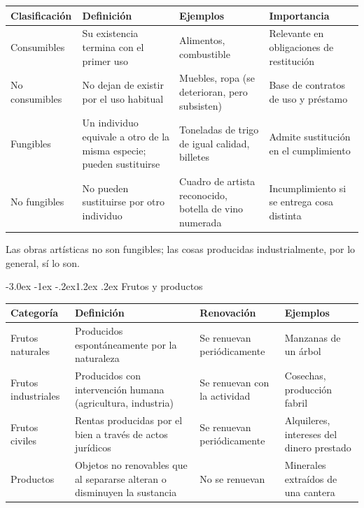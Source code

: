 \documentclass[12pt,oneside]{book}
\makeatletter
\renewcommand\section{\@startsection{section}{1}{\z@}%
  {-3.0ex \@plus -1ex \@minus -.2ex}{1.2ex \@plus .2ex}%
  {\normalfont\large\bfseries\color{acento}}}
\newenvironment{tabla}{%
    \par\medskip\begingroup\small\renewcommand{\arraystretch}{1.3}\noindent\ignorespaces
}{%
    \par\endgroup\medskip
}
\makeatother
\begin{document}
\begin{tabla}
\begin{tabularx}{\textwidth}{B{3.0cm}YYY}
\toprule
Clasificación & \textbf{Definición} & \textbf{Ejemplos} & \textbf{Importancia} \\
\midrule
Consumibles & Su existencia termina con el primer uso & Alimentos, combustible & Relevante en obligaciones de restitución \\
No consumibles & No dejan de existir por el uso habitual & Muebles, ropa (se deterioran, pero subsisten) & Base de contratos de uso y préstamo \\
Fungibles & Un individuo equivale a otro de la misma especie; pueden sustituirse & Toneladas de trigo de igual calidad, billetes & Admite sustitución en el cumplimiento \\
No fungibles & No pueden sustituirse por otro individuo & Cuadro de artista reconocido, botella de vino numerada & Incumplimiento si se entrega cosa distinta \\
\bottomrule
\end{tabularx}
\end{tabla}

Las obras artísticas no son fungibles; las cosas producidas industrialmente, por lo general, sí lo son.

\section{Frutos y productos}

\begin{tabla}
\begin{tabularx}{\textwidth}{B{3.2cm}YYY}
\toprule
Categoría & \textbf{Definición} & \textbf{Renovación} & \textbf{Ejemplos} \\
\midrule
Frutos naturales & Producidos espontáneamente por la naturaleza & Se renuevan periódicamente & Manzanas de un árbol \\
Frutos industriales & Producidos con intervención humana (agricultura, industria) & Se renuevan con la actividad & Cosechas, producción fabril \\
Frutos civiles & Rentas producidas por el bien a través de actos jurídicos & Se renuevan periódicamente & Alquileres, intereses del dinero prestado \\
Productos & Objetos no renovables que al separarse alteran o disminuyen la sustancia & No se renuevan & Minerales extraídos de una cantera \\
\bottomrule
\end{tabularx}
\end{tabla}
\end{document}
